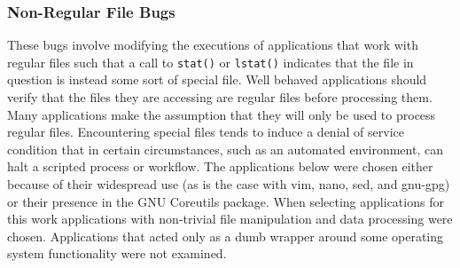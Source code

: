         \subsubsection{Non-Regular File Bugs}

        These bugs involve modifying the executions of applications that work with regular files such that a call to
        {\tt stat()} or {\tt lstat()} indicates that the file in question is instead some sort of special file.  Well
        behaved applications should verify that the files they are accessing are regular files before processing them.
        Many applications make the assumption that they will only be used to process regular files.  Encountering
        special files tends to induce a denial of service condition that in certain circumstances, such as an automated
        environment, can halt a scripted process or workflow.  The applications below were chosen either because of
        their widespread use (as is the case with vim, nano, sed, and gnu-gpg) or their presence in the GNU Coreutils
        package.  When selecting applications for this work applications with non-trivial file manipulation and data
        processing were chosen.  Applications that acted only as a dumb wrapper around some operating system
        functionality were not examined.


